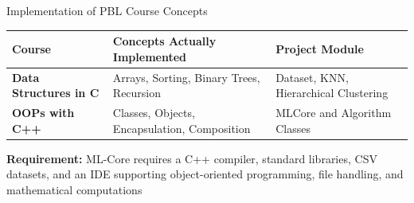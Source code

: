 \documentclass[aspectratio=169,11pt]{beamer}
\begin{document}
\begin{frame}{Implementation of PBL Course Concepts}

\scriptsize

\begin{center}

\renewcommand{\arraystretch}{1.25}

\begin{tabularx}{.96\textwidth}
{@{}>{\bfseries}p{2.8cm}X p{2.8cm}@{}}

\toprule
Course & Concepts Actually Implemented & Project Module\\
\midrule

Data Structures in C &
{Arrays, Sorting, Binary Trees, Recursion} &
{Dataset, KNN, Hierarchical Clustering}\\

OOPs with C++ &
{Classes, Objects, Encapsulation, Composition} &
{MLCore and Algorithm Classes}\\

\bottomrule

\end{tabularx}

\end{center}

\vfill

\begin{center}
\colorbox{GEULightBlue}{
\parbox{.88\textwidth}{
\centering
\textbf{Requirement:}
ML-Core requires a C++ compiler, standard libraries, CSV datasets, and an IDE supporting object-oriented programming, file handling, and mathematical computations
}}
\end{center}

\end{frame}
\end{document}
